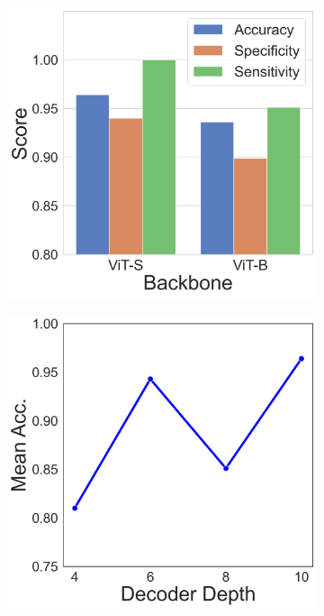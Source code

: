 \begin{figure}[!t]
\begin{subfigure}[b]{0.23\linewidth}
		\caption{}
		\label{focusmae_fig:ablation_loss}
	\end{subfigure}
	\begin{subfigure}[b]{0.23\linewidth}
		\centering
		\includegraphics[width=\linewidth]{figs/focusmae/abl_enc.png}
		\caption{}
		\label{focusmae_fig:ablation_enc}
    \end{subfigure}	
    \begin{subfigure}[b]{0.23\linewidth}
		\centering
		\includegraphics[width=\linewidth]{figs/focusmae/abl_dec.png}

\end{subfigure}
\end{figure}
